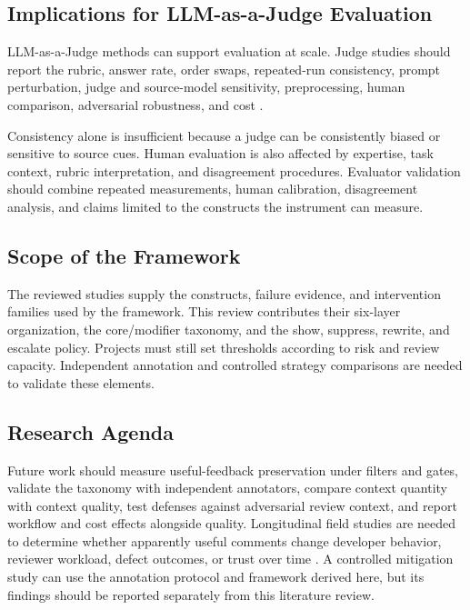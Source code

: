 \documentclass[10pt]{article}
\begin{document}
\subsection{Implications for LLM-as-a-Judge Evaluation}

LLM-as-a-Judge methods can support evaluation at scale. Judge studies should report the rubric, answer rate, order swaps, repeated-run consistency, prompt perturbation, judge and source-model sensitivity, preprocessing, human comparison, adversarial robustness, and cost \cite{p29_wang2025_human_evaluators,p31_jiang2025_codejudgebench,p32_zhao2026_bias_loop,p33_he2025_llmjudge_se}.

Consistency alone is insufficient because a judge can be consistently biased or sensitive to source cues. Human evaluation is also affected by expertise, task context, rubric interpretation, and disagreement procedures. Evaluator validation should combine repeated measurements, human calibration, disagreement analysis, and claims limited to the constructs the instrument can measure.

\subsection{Scope of the Framework}

The reviewed studies supply the constructs, failure evidence, and intervention families used by the framework. This review contributes their six-layer organization, the core/modifier taxonomy, and the show, suppress, rewrite, and escalate policy. Projects must still set thresholds according to risk and review capacity. Independent annotation and controlled strategy comparisons are needed to validate these elements.

\subsection{Research Agenda}

Future work should measure useful-feedback preservation under filters and gates, validate the taxonomy with independent annotators, compare context quantity with context quality, test defenses against adversarial review context, and report workflow and cost effects alongside quality. Longitudinal field studies are needed to determine whether apparently useful comments change developer behavior, reviewer workload, defect outcomes, or trust over time \cite{p77_lin2026_is_agentic_code_review_helpful,p100_sun2025_does_ai_code_review_lead_to_co,p110_a_alsteinsson2025_rethinking_code_review_workflo}. A controlled mitigation study can use the annotation protocol and framework derived here, but its findings should be reported separately from this literature review.
\end{document}
